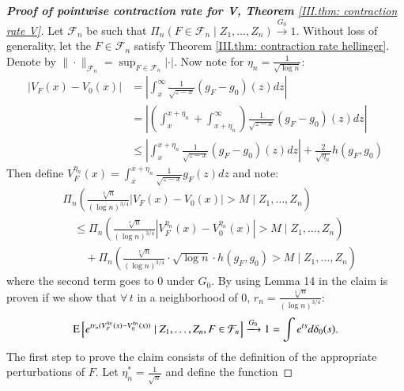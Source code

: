 \begin{proof}[\hypertarget{III.proof contraction pointwise V}{\textbf{Proof of pointwise contraction rate for V, Theorem} \ref{III.thm: contraction rate V}}] 
    Let $\mathcal{F}_n$ be such that $\Pi_n (F \in \mathcal{F}_n \mid Z_1, \dots, Z_n) \xrightarrow{G_0} 1$. Without loss of generality, let the $F \in \mathcal{F}_n$ satisfy Theorem \ref{III.thm: contraction rate hellinger}. Denote by $\| \cdot \|_{\mathcal{F}_n} = \sup_{F \in \mathcal{F}_n} | \cdot |$. Now note for $\eta_n = \frac{1}{\sqrt{\log n}}$:
    \begin{align*}
    |V_{\scriptscriptstyle{F}}(x) - V_{0}(x)| &= \left| \int_x^\infty \frac{1}{\sqrt{z-x}} (g_{\scriptscriptstyle{F}} - g_{0})(z) dz \right| \\
    &= \left| \left( \int_x^{x+\eta_n} + \int_{x+\eta_n}^\infty \right) \frac{1}{\sqrt{z-x}} (g_{\scriptscriptstyle{F}} - g_{0})(z) dz \right| \\
    &\leq \left| \int_x^{x+\eta_n} \frac{1}{\sqrt{z-x}} (g_{\scriptscriptstyle{F}} - g_{0})(z) dz \right| + \frac{2}{\sqrt{\eta_n}} h(g_{\scriptscriptstyle{F}}, g_{0})
    \end{align*}
    Then define $V_{\scriptscriptstyle{F}}^{\eta_n}(x) = \int_x^{x+\eta_n} \frac{1}{\sqrt{z-x}} g_F(z) dz$ and note:
    \begin{align*}
        &\Pi_n \left( \frac{\sqrt[4]{n}}{(\log n)^{3/4}} |V_{\scriptscriptstyle{F}}(x) - V_{0}(x)| > M \mid Z_1, \dots, Z_n \right) \\
        &\quad \leq \Pi_n \left( \frac{\sqrt[4]{n}}{(\log n)^{3/4}} |V_{\scriptscriptstyle{F}}^{\eta_n}(x) - V_{0}^{\eta_n}(x)| > M \mid Z_1, \dots, Z_n \right) \\
        &\quad \quad + \Pi_n \left( \frac{\sqrt[4]{n}}{(\log n)^{3/4}} \cdot \sqrt{\log n} \cdot h(g_{\scriptscriptstyle{F}}, g_{0}) > M \mid Z_1, \dots, Z_n \right)
    \end{align*}
    where the second term goes to 0 under $G_0$. By using Lemma 14 in \cite{26} the claim is proven if we show that $\forall \, t$ in a neighborhood of 0, $r_n = \frac{\sqrt[4]{n}}{(\log n)^{3/4}}$:
    \begin{align}\label{III.eq: contraction statement 1}
        \mathrm{E} \left[e^{t r_n (V_{\scriptscriptstyle{F}}^{\eta_n}(x) - V_{0}^{\eta_n}(x))} \mid Z_1, \dots, Z_n, F \in \mathcal{F}_n \right] \xrightarrow{G_0} 1 = \int e^{ts} d \delta_0(s).
    \end{align}
    The first step to prove the claim consists of the definition of the appropriate perturbations of $F$. Let $\eta_n^* = \frac{1}{\sqrt{n}}$ and define the function 

\end{proof}
